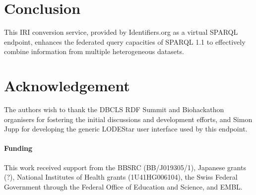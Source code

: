 \documentclass{bioinfo}
\begin{document}
\section{Conclusion}
This IRI conversion service, provided by Identifiers.org as a virtual SPARQL endpoint, enhances the federated query capacities of SPARQL 1.1 to effectively combine information from multiple heterogeneous datasets.

\section*{Acknowledgement}
The authors wish to thank the DBCLS RDF Summit and Biohackathon organisers for fostering the initial discussions and development efforts, and Simon Jupp for developing the generic LODEStar user interface used by this endpoint.

\paragraph{Funding\textcolon} 
This work received support from the BBSRC (BB/J019305/1), Japanese grants (?), National Institutes of Health grants (1U41HG006104), the Swiss Federal Government through the Federal Office of Education and Science, and EMBL.  


%
%
%
%
%
%
%
%
  
\end{document}
